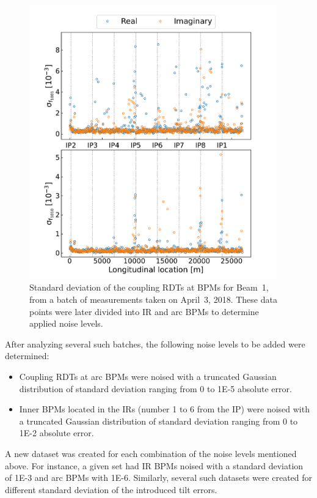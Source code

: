 \begin{figure}[!htb]
    \centering
    \includegraphics*[width=0.95\textwidth]{Figures/ML_for_IR_Coupling/ml_rdts_batch_stdev.pdf}
    \caption{Standard deviation of the coupling RDTs at BPMs for Beam~\num{1}, from a batch of measurements taken on April~\num{3}, \num{2018}. These data points were later divided into IR and arc BPMs to determine applied noise levels.}
    \label{figure:rdts_stdev_batch}
\end{figure}

After analyzing several such batches, the following noise levels to be added were determined:
\begin{itemize}
  \item Coupling RDTs at arc BPMs were noised with a truncated Gaussian distribution of standard deviation ranging from \num{0} to \num{1E-5} absolute error.
  \item Inner BPMs located in the IRs (number \num{1} to \num{6} from the IP) were noised with a truncated Gaussian distribution of standard deviation ranging from \num{0} to \num{1E-2} absolute error.
\end{itemize}

A new dataset was created for each combination of the noise levels mentioned above.
For instance, a given set had IR BPMs noised with a standard deviation of \num{1E-3} and arc BPMs with \num{1E-6}.
Similarly, several such datasets were created for different standard deviation of the introduced tilt errors.

